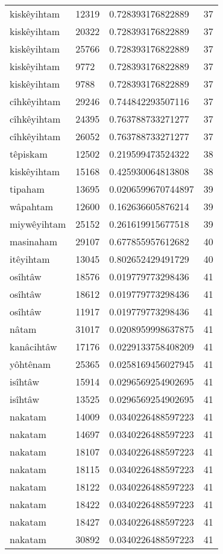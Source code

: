 \begin{longtable}{llll}
kiskêyihtam & 12319 & 0.728393176822889 & 37 \\
kiskêyihtam & 20322 & 0.728393176822889 & 37 \\
kiskêyihtam & 25766 & 0.728393176822889 & 37 \\
kiskêyihtam & 9772 & 0.728393176822889 & 37 \\
kiskêyihtam & 9788 & 0.728393176822889 & 37 \\
cîhkêyihtam & 29246 & 0.744842293507116 & 37 \\
cîhkêyihtam & 24395 & 0.763788733271277 & 37 \\
cîhkêyihtam & 26052 & 0.763788733271277 & 37 \\
têpiskam & 12502 & 0.219599473524322 & 38 \\
kiskêyihtam & 15168 & 0.425930064813808 & 38 \\
tipaham & 13695 & 0.0206599670744897 & 39 \\
wâpahtam & 12600 & 0.162636605876214 & 39 \\
miywêyihtam & 25152 & 0.261619915677518 & 39 \\
masinaham & 29107 & 0.677855957612682 & 40 \\
itêyihtam & 13045 & 0.802652429491729 & 40 \\
osîhtâw & 18576 & 0.019779773298436 & 41 \\
osîhtâw & 18612 & 0.019779773298436 & 41 \\
osîhtâw & 11917 & 0.019779773298436 & 41 \\
nâtam & 31017 & 0.0208959998637875 & 41 \\
kanâcihtâw & 17176 & 0.0229133758408209 & 41 \\
yôhtênam & 25365 & 0.0258169456027945 & 41 \\
isîhtâw & 15914 & 0.0296569254902695 & 41 \\
isîhtâw & 13525 & 0.0296569254902695 & 41 \\
nakatam & 14009 & 0.0340226488597223 & 41 \\
nakatam & 14697 & 0.0340226488597223 & 41 \\
nakatam & 18107 & 0.0340226488597223 & 41 \\
nakatam & 18115 & 0.0340226488597223 & 41 \\
nakatam & 18122 & 0.0340226488597223 & 41 \\
nakatam & 18422 & 0.0340226488597223 & 41 \\
nakatam & 18427 & 0.0340226488597223 & 41 \\
nakatam & 30892 & 0.0340226488597223 & 41 \\

\end{longtable}
